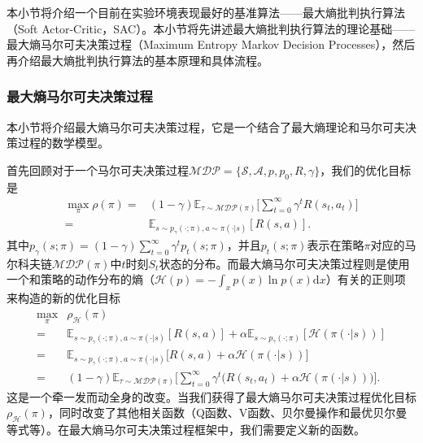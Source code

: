 本小节将介绍一个目前在实验环境表现最好的基准算法——最大熵批判执行算法\cite{haarnoja2018soft}（Soft Actor-Critic，SAC）。本小节将先讲述最大熵批判执行算法的理论基础——最大熵马尔可夫决策过程\cite{haarnoja2017reinforcement,todorov2008general,kappen2005path}（Maximum Entropy Markov Decision Processes），然后再介绍最大熵批判执行算法的基本原理和具体流程。

\subsubsection{最大熵马尔可夫决策过程}

本小节将介绍最大熵马尔可夫决策过程，它是一个结合了最大熵理论和马尔可夫决策过程的数学模型。

首先回顾对于一个马尔可夫决策过程$\mathcal{MDP} = \{\mathcal{S}, \mathcal{A}, p, p_0, R, \gamma\}$，我们的优化目标是
\begin{equation}
    \begin{aligned}
    \max_{\pi} \rho(\pi) =& (1 - \gamma) \mathbb{E}_{\tau \sim \mathcal{MDP}(\pi)} \bigg[\sum^{\infty}_{t=0} \gamma^t R(s_t, a_t)\bigg]\\
    =& \mathbb{E}_{s \sim p_{\gamma}(\cdot; \pi), a \sim \pi(\cdot \vert s)}[R(s, a)].
    \end{aligned}
\end{equation}
其中$p_\gamma(s; \pi) = (1 - \gamma) \sum^{\infty}_{t=0} \gamma^t p_t(s; \pi)$，并且$p_t(s; \pi)$表示在策略$\pi$对应的马尔科夫链$\mathcal{MDP}(\pi)$中$t$时刻$S_t$状态的分布。而最大熵马尔可夫决策过程则是使用一个和策略的动作分布的熵（$\mathcal{H}(p) = -\int_x p(x) \ln p(x) \mathrm{d} x$）有关的正则项来构造的新的优化目标
\begin{equation}
    \begin{aligned}
    \max_{\pi} &\rho_{\mathcal{H}}(\pi) \\
    =& \mathbb{E}_{s \sim p_{\gamma}(\cdot; \pi), a \sim \pi(\cdot \vert s)}[R(s, a)] + \alpha \mathbb{E}_{s \sim p_{\gamma}(\cdot; \pi)}[\mathcal{H}(\pi(\cdot \vert s))]\\
    =& \mathbb{E}_{s \sim p_{\gamma}(\cdot; \pi), a \sim \pi(\cdot \vert s)}\bigg[R(s, a) + \alpha \mathcal{H}(\pi(\cdot \vert s))\bigg]\\
    =& (1 - \gamma) \mathbb{E}_{\tau \sim \mathcal{MDP}(\pi)} \bigg[\sum^{\infty}_{t=0} \gamma^t \bigg(R(s_t, a_t) + \alpha \mathcal{H}(\pi(\cdot \vert s))\bigg)\bigg].
    \end{aligned}
\end{equation}
这是一个牵一发而动全身的改变。当我们获得了最大熵马尔可夫决策过程优化目标$\rho_{\mathcal{H}}(\pi)$，同时改变了其他相关函数（Q函数、V函数、贝尔曼操作和最优贝尔曼等式等）。在最大熵马尔可夫决策过程框架中，我们需要定义新的函数。


